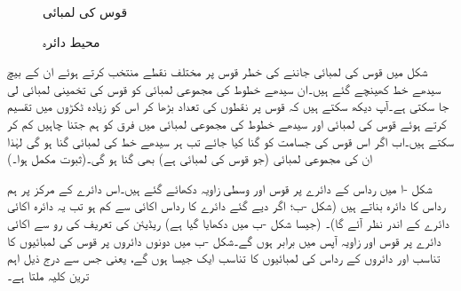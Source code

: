 \begin{figure}
\centering
\begin{minipage}{0.45\textwidth}
\centering
{}
\caption{قوس کی لمبائی}
\label{شکل_ابتدا_قوس_لمبائی}
\end{minipage}\hfill
\begin{minipage}{0.45\textwidth}
\centering
\centering
{}
\caption{محیط دائرہ}
\label{شکل_ابتدا_دائرہ_اور_ریڈیئن}
\end{minipage}%
\end{figure}

شکل  میں قوس کی لمبائی جاننے کی خطر قوس پر مختلف نقطے منتخب کرتے ہوئے ان کے بیچ سیدھے خط کھینچے گئے ہیں۔ان سیدھے خطوط کی مجموعی لمبائی کو قوس کی تخمینی لمبائی لی جا سکتی ہے۔آپ دیکھ سکتے ہیں کہ قوس پر نقطوں کی تعداد بڑھا کر اس کو زیادہ ٹکڑوں میں تقسیم کرتے ہوئے قوس کی لمبائی اور سیدھے خطوط کی مجموعی لمبائی میں فرق کو ہم جتنا چاہیں کم کر سکتے ہیں۔اب اگر اس قوس کی جسامت کو  گنا کیا جائے تب ہر سیدھے خط کی لمبائی  گنا ہو گی لہٰذا ان کی مجموعی لمبائی (جو قوس کی لمبائی ہے) بھی  گنا ہو گی۔(ثبوت مکمل ہوا۔)


شکل -ا میں رداس  کے دائرے پر قوس  اور وسطی زاویہ  دکھائے گئے ہیں۔اس دائرے کے مرکز پر ہم  رداس کا دائرہ بناتے ہیں (شکل -ب؛ اگر دیے گئے دائرے کا رداس اکائی سے کم ہو تب یہ دائرہ اکائی دائرے کے اندر نظر آئے گا)۔ (جیسا شکل -ب میں دکھایا گیا ہے) ریڈیئن کی تعریف کی رو سے اکائی دائرے پر قوس اور زاویہ آپس میں برابر ہوں گے۔شکل -ب میں دونوں دائروں پر  قوس کی لمبائیوں کا تناسب  اور دائروں کے رداس کی لمبائیوں کا تناسب  ایک جیسا ہوں گے، یعنی  جس سے درج ذیل اہم ترین کلیہ ملتا ہے۔

